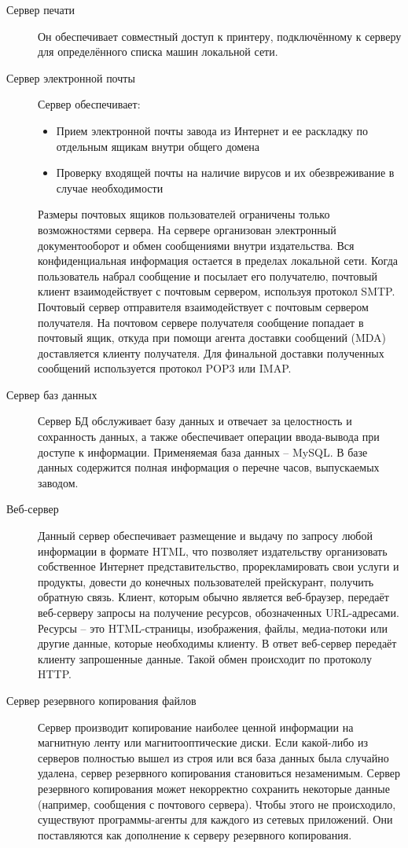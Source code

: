 \begin{description}
\item[Сервер печати]
  Он обеспечивает совместный доступ к принтеру, подключённому к серверу для определённого списка машин локальной сети.
\item[Сервер электронной почты]
  Сервер обеспечивает:
  \begin{itemize}
  \item Прием электронной почты завода из Интернет и ее раскладку по отдельным ящикам внутри общего домена
  \item Проверку входящей почты на наличие вирусов и их обезвреживание в случае необходимости
  \end{itemize}
  Размеры почтовых ящиков пользователей ограничены только возможностями сервера. На сервере организован электронный документооборот и обмен сообщениями внутри издательства. Вся конфиденциальная информация остается в пределах локальной сети.
  Когда пользователь набрал сообщение и посылает его получателю, почтовый клиент взаимодействует с почтовым сервером, используя протокол SMTP. Почтовый сервер отправителя взаимодействует с почтовым сервером получателя. На почтовом сервере получателя сообщение попадает в почтовый ящик, откуда при помощи агента доставки сообщений (MDA) доставляется клиенту получателя. Для финальной доставки полученных сообщений используется протокол POP3 или IMAP.
\item[Сервер баз данных]
  Сервер БД обслуживает базу данных и отвечает за целостность и сохранность данных, а также обеспечивает операции ввода-вывода при доступе к информации. Применяемая база данных – MySQL. В базе данных содержится полная информация о перечне часов, выпускаемых заводом.
\item[Веб-сервер]
  Данный сервер обеспечивает размещение и выдачу по запросу любой информации в формате HTML, что позволяет издательству организовать собственное Интернет представительство, прорекламировать свои услуги и продукты, довести до конечных пользователей прейскурант, получить обратную связь.
  Клиент, которым обычно является веб-браузер, передаёт веб-серверу запросы на получение ресурсов, обозначенных URL-адресами. Ресурсы – это HTML-страницы, изображения, файлы, медиа-потоки или другие данные, которые необходимы клиенту. В ответ веб-сервер передаёт клиенту запрошенные данные. Такой обмен происходит по протоколу HTTP.
\item[Сервер резервного копирования файлов]
  Сервер производит копирование наиболее ценной информации на магнитную ленту или магнитооптические диски. Если какой-либо из серверов полностью вышел из строя или вся база данных была случайно удалена, сервер резервного копирования становиться незаменимым. Сервер резервного копирования может некорректно сохранить некоторые данные (например, сообщения с почтового сервера). Чтобы этого не происходило, существуют программы-агенты для каждого из сетевых приложений. Они поставляются как дополнение к серверу резервного копирования.

\end{description}
